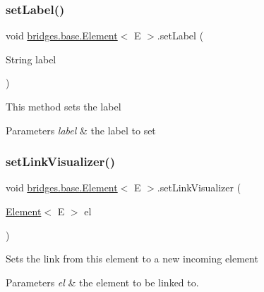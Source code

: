 \subsubsection{\texorpdfstring{setLabel()}{setLabel()}}
{\footnotesize\ttfamily void \mbox{\hyperlink{classbridges_1_1base_1_1_element}{bridges.\+base.\+Element}}$<$ E $>$.set\+Label (\begin{DoxyParamCaption}\item[{String}]{label }\end{DoxyParamCaption})}

This method sets the label


\begin{DoxyParams}{Parameters}
{\em label} & the label to set \\
\hline
\end{DoxyParams}
\mbox{\label{classbridges_1_1base_1_1_element_af6251f52b9d277dd77e3bab1829d0197}} 
\subsubsection{\texorpdfstring{setLinkVisualizer()}{setLinkVisualizer()}}
{\footnotesize\ttfamily void \mbox{\hyperlink{classbridges_1_1base_1_1_element}{bridges.\+base.\+Element}}$<$ E $>$.set\+Link\+Visualizer (\begin{DoxyParamCaption}\item[{\mbox{\hyperlink{classbridges_1_1base_1_1_element}{Element}}$<$ E $>$}]{el }\end{DoxyParamCaption})\hspace{0.3cm}{\ttfamily [protected]}}

Sets the link from this element to a new incoming element


\begin{DoxyParams}{Parameters}
{\em el} & the element to be linked to. \\
\hline
\end{DoxyParams}
\mbox{\label{classbridges_1_1base_1_1_element_a0fe9a52d06e8f3ccc8521e155ec72a27}} 
